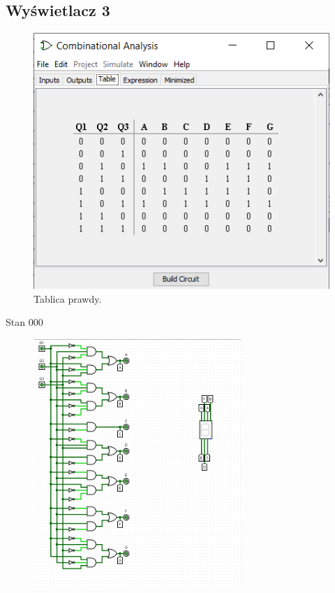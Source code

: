 \documentclass[]{article}
\begin{document}
\subsection{Wyświetlacz 3}
\begin{figure}[H]
	\centering
	\includegraphics[width=1\textwidth]{TRZY_Tab.png}
	\caption{Tablica prawdy.}
\end{figure}
\newpage
Stan 000
\begin{figure}[H]
	\centering
	\includegraphics[width=0.7\textwidth]{TTRZY_000.png}
\end{figure}
\end{document}
